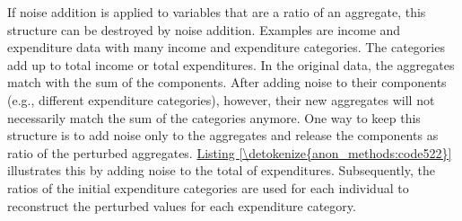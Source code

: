 \documentclass[letterpaper,10pt,english]{sphinxmanual}
\begin{document}
If noise addition is applied to variables that are a ratio of an
aggregate, this structure can be destroyed by noise addition. Examples
are income and expenditure data with many income and expenditure
categories. The categories add up to total income or total expenditures.
In the original data, the aggregates match with the sum of the
components. After adding noise to their components (e.g., different
expenditure categories), however, their new aggregates will not
necessarily match the sum of the categories anymore. One way to keep
this structure is to add noise only to the aggregates and release the
components as ratio of the perturbed aggregates. \hyperref[\detokenize{anon_methods:code522}]{Listing \ref{\detokenize{anon_methods:code522}}}
illustrates this by adding noise to the total of expenditures.
Subsequently, the ratios of the initial expenditure categories are used
for each individual to reconstruct the perturbed values for each
expenditure category.
\end{document}
